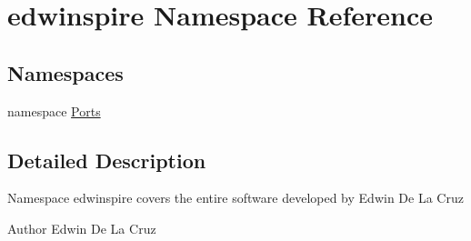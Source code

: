 \hypertarget{namespaceedwinspire}{\section{edwinspire Namespace Reference}
\label{namespaceedwinspire}
}
\subsection*{Namespaces}
\begin{DoxyCompactItemize}
\item 
namespace \hyperlink{namespaceedwinspire_1_1_ports}{Ports}
\end{DoxyCompactItemize}


\subsection{Detailed Description}
Namespace edwinspire covers the entire software developed by Edwin De La Cruz

\begin{DoxyAuthor}{Author}
Edwin De La Cruz 
\end{DoxyAuthor}
